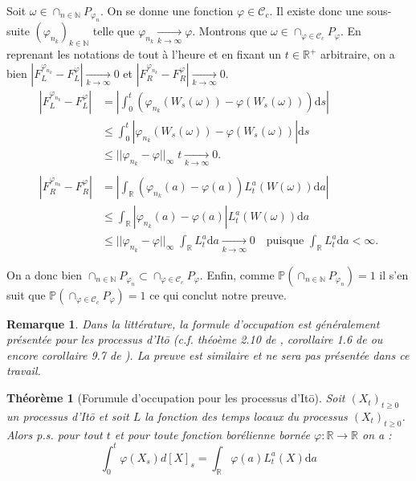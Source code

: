 \documentclass[openany]{book}
\makeatletter
\renewcommand{\P}{\mathds{P}}
\newcommand{\R}{\mathbb{R}}
\newcommand{\1}{\mathbbm{1}}
\renewcommand{\d}{\mathrm{d}}
\renewenvironment{proof}[1][\textbf{\textit{Démonstration}}]{%
  \par\pushQED{\qed}%
  \normalfont\topsep6\p@\@plus6\p@\relax
  \trivlist\item[\hskip\labelsep
    #1\@addpunct{.}]\ignorespaces
}{%
  \popQED\endtrivlist\@endpefalse
}
\theoremstyle{thmfont}
\newtheorem{theorem}{Théorème}[chapter]
\theoremstyle{deffont}
\theoremstyle{thmfont}
\theoremstyle{deffont}
\newtheorem{remark}[remark]{Remarque}
\makeatother
\begin{document}
\begin{proof}
  Soit $\omega \in \cap_{n\in \mathbb N}P_{\varphi_n}$. On se donne une fonction $\varphi \in \mathcal C_c$. Il existe donc une sous-suite $(\varphi_{n_k})_{k\in\mathbb N}$ telle que $\varphi_{n_k} \xrightarrow[k \to \infty]{} \varphi$. Montrons que $\omega \in \cap_{\varphi \in \mathcal C_c} P_\varphi$. En reprenant les notations de tout à l'heure et en fixant un $t \in \R^+$ arbitraire, on a bien $|F_L^{\varphi_{n_k}} - F_L^\varphi|\xrightarrow[k \to \infty]{} 0$ et $|F_R^{\varphi_{n_k}} - F_R^\varphi|\xrightarrow[k \to \infty]{} 0$.
%
\begin{align*}
  |F_L^{\varphi_{n_k}} - F_L^\varphi| &= \left|\int_0^t \left( \varphi_{n_k}(W_s(\omega)) - \varphi(W_s(\omega))\right)\d s\right|\\
                        &\leq \int_0^t \left| \varphi_{n_k}(W_s(\omega)) - \varphi(W_s(\omega))\right|\d s\\
                        &\leq ||\varphi_{n_k} - \varphi||_{\infty} \;t \xrightarrow[k \to \infty]{} 0.\\
  \\
  |F_R^{\varphi_{n_k}} - F_R^\varphi| &= \left|\int_\R \left( \varphi_{n_k}(a) - \varphi(a)\right) L_t^a(W(\omega))\d a\right|\\
                          &\leq \int_\R |\varphi_{n_k}(a) - \varphi(a)| L_t^a(W(\omega))\d a\\
                          &\leq ||\varphi_{n_k} - \varphi||_\infty \; \int_\R L_t^a\d a \xrightarrow[k\to \infty]{} 0\quad\text{puisque $\int_\R L_t^a\d a < \infty$.}
\end{align*}

\noindent On a donc bien $\cap_{n\in \mathbb N} P_{\varphi_n} \subset \cap_{\varphi \in \mathcal C_c} P_\varphi$. Enfin, comme $\P(\cap_{n\in \mathbb N} P_{\varphi_n}) = 1$ il s'en suit que $\P(\cap_{\varphi \in \mathcal C_c} P_\varphi) = 1$ ce qui conclut notre preuve.

\end{proof}

\begin{remark}
  Dans la littérature, la formule d'occupation est généralement présentée pour les processus d'Itō (c.f. théoème 2.10 de \cite{zambotti}, corollaire 1.6 de \cite{revuz-yor} ou encore corollaire 9.7 de \cite{legall}). La preuve est similaire et ne sera pas présentée dans ce travail.
\end{remark}

\begin{theorem}[Forumule d'occupation pour les processus d'Itō]
  Soit $(X_t)_{t\geq0}$ un processus d'Itō et soit $L$ la fonction des temps locaux du processus $(X_t)_{t\geq0}$. Alors p.s. pour tout $t$ et pour toute fonction borélienne bornée $\varphi : \R \rightarrow \R$ on a :
  \begin{equation}
    \int_0^t \varphi(X_s) d[X]_s = \int_\R \varphi(a) L_t^a(X)\d a
  \end{equation}
  
\end{theorem}
\end{document}
